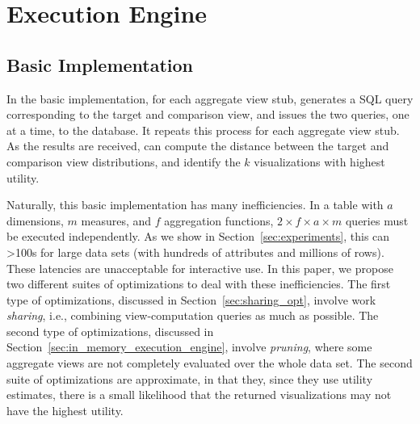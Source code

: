 \section{\SeeDB Execution Engine}
\label{sec:optimizer}

\subsection{Basic Implementation}
\label{sec:basic_implementation}

In the basic implementation, for each aggregate view stub, \SeeDB generates
a SQL query corresponding to the target
and comparison view, and issues
the two queries, one at a time, to the database.
It repeats this process for each aggregate view stub.
As the results are received, \SeeDB can compute the
distance between the target and comparison view
distributions, and identify the $k$ visualizations
with highest utility. 

Naturally, this basic implementation has many inefficiencies.
In a table with $a$ dimensions, $m$ measures, and $f$ aggregation functions, 
$2\times f \times a \times  m$ queries must be executed independently.  
As we show in Section~\ref{sec:experiments}, this can >100s for
large data sets (with hundreds of attributes and millions of rows).
These latencies are unacceptable for interactive use.
In this paper, we propose two different suites of optimizations to deal with these
inefficiencies.
The first type of optimizations, discussed in Section~\ref{sec:sharing_opt}, involve work {\em sharing},
i.e., combining view-computation queries as much as possible.
The second type of optimizations, discussed in Section~\ref{sec:in_memory_execution_engine}, involve {\em pruning}, where some aggregate views are not completely evaluated over the whole data set.
 The second suite of optimizations
are approximate, in that they, since they use utility estimates, there is a small likelihood that the returned visualizations may not have the highest utility.


